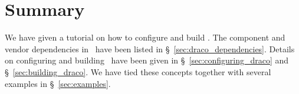 
\section{Summary}

We have given a tutorial on how to configure and build \draco.  The
component and vendor dependencies in \draco\ have been listed in
\S~\ref{sec:draco_dependencies}.  Details on configuring and
building \draco\ have been given in \S~\ref{sec:configuring_draco} and 
\S~\ref{sec:building_draco}.  We have tied these concepts together with
several examples in \S~\ref{sec:examples}.
